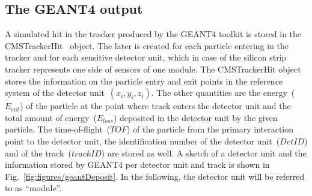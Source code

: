 




\subsection{The GEANT4 output~\label{sec:G4out}}

A simulated hit in the tracker produced by the GEANT4 toolkit is stored in the CMSTrackerHit~\cite{Lefebure:1364020} object. The later is created for each particle entering in the tracker and for each sensitive detector unit, which in case of the silicon strip tracker represents one side of sensors of one module. The CMSTrackerHit object stores the information on the particle entry and exit points in the reference system of the detector unit~$(x_{i}, y_{i}, z_{i})$. The other quantities are the energy~($E_{ent}$) of the particle at the point where track enters the detector unit and the total amount of energy~($E_{loss}$) deposited in the detector unit by the given particle. The time-of-flight~($TOF$) of the particle from the primary interaction point to the detector unit, the identification number of the detector unit~($DetID$) and of the track~($trackID$) are stored as well. A sketch of a detector unit and the information stored by GEANT4 per detector unit and track is shown in Fig.~\ref{fig:figures/geantDeposit}. In the following, the detector unit will be referred to as ``module''.

